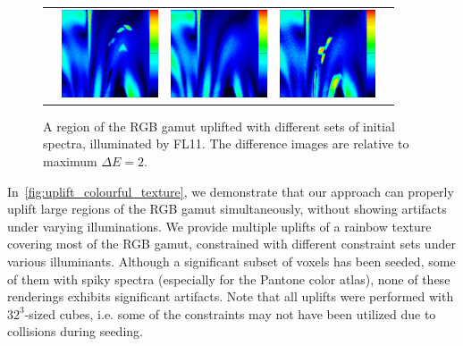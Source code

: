 \begin{figure}[t]
{\begin{tabular}{ccccc}
			& \quad
			\includegraphics[width=.20\linewidth, height=7em]{img/gradient_diff_mbc.png}
			& \quad
			\includegraphics[width=.20\linewidth, height=7em]{img/gradient_diff_middle.png}
			& \quad
			\includegraphics[width=.20\linewidth, height=7em]{img/gradient_diff_pantone.png}\\
		\end{tabular}
	}
	\caption{A region of the RGB gamut uplifted with different sets of initial spectra, illuminated by FL11. The difference images are relative to maximum $\Delta E = 2$.}
	\label{fig:colorimetric_properties}
	\vspace{-1em}
\end{figure}

In~\cref{fig:uplift_colourful_texture}, we demonstrate that our approach can properly uplift large regions of the RGB gamut simultaneously, without showing artifacts under varying illuminations. We provide multiple uplifts of a rainbow texture covering most of the RGB gamut, constrained with different constraint sets under various illuminants. Although a significant subset of voxels has been seeded, some of them with spiky spectra (especially for the Pantone color atlas), none of these renderings exhibits significant artifacts. Note that all uplifts were performed with $32^3$-sized cubes, i.e. some of the constraints may not have been utilized due to collisions during seeding.

